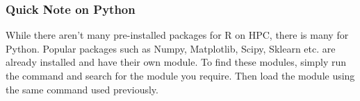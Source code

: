 \subsubsection{Quick Note on Python}
%
%
While there aren't many pre-installed packages for R on HPC, there is many for Python. Popular packages such as Numpy, Matplotlib, Scipy, Sklearn etc. are already installed and have their own module. To find these modules, simply run the  command and search for the module you require. Then load the module using the same  command used previously.
%
%
%
